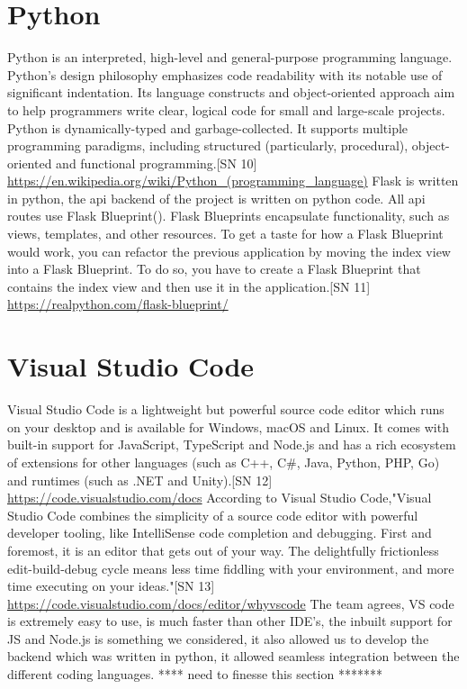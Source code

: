 \section{Python}
Python is an interpreted, high-level and general-purpose programming language. Python's design philosophy emphasizes code readability with its notable use of significant indentation. Its language constructs and object-oriented approach aim to help programmers write clear, logical code for small and large-scale projects.
Python is dynamically-typed and garbage-collected. It supports multiple programming paradigms, including structured (particularly, procedural), object-oriented and functional programming.[SN 10] \url{https://en.wikipedia.org/wiki/Python_(programming_language)}
Flask is written in python, the api backend of the project is written on python code. All api routes use Flask Blueprint().
Flask Blueprints encapsulate functionality, such as views, templates, and other resources. To get a taste for how a Flask Blueprint would work, you can refactor the previous application by moving the index view into a Flask Blueprint. To do so, you have to create a Flask Blueprint that contains the index view and then use it in the application.[SN 11] \url{https://realpython.com/flask-blueprint/}

\section{Visual Studio Code}
Visual Studio Code is a lightweight but powerful source code editor which runs on your desktop and is available for Windows, macOS and Linux. It comes with built-in support for JavaScript, TypeScript and Node.js and has a rich ecosystem of extensions for other languages (such as C++, C\#, Java, Python, PHP, Go) and runtimes (such as .NET and Unity).[SN 12] \url{https://code.visualstudio.com/docs}
According to Visual Studio Code,"Visual Studio Code combines the simplicity of a source code editor with powerful developer tooling, like IntelliSense code completion and debugging.
First and foremost, it is an editor that gets out of your way. The delightfully frictionless edit-build-debug cycle means less time fiddling with your environment, and more time executing on your ideas."[SN 13] \url{https://code.visualstudio.com/docs/editor/whyvscode}
The team agrees, VS code is extremely easy to use, is much faster than other IDE's, the inbuilt support for JS and Node.js is something we considered, it also allowed us to develop the backend which was written in python, it allowed seamless integration between the different coding languages. **** need to finesse this section *******


